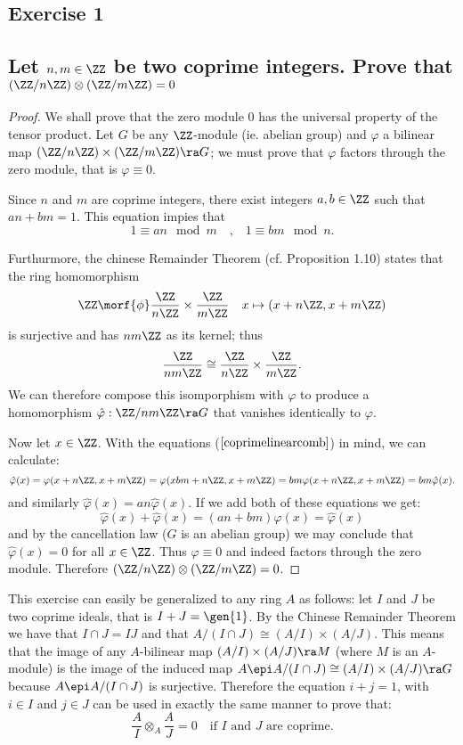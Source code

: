 \subsection*{Exercise 1}
\subsection*{%
Let $n,m\in\ZZ$ be two coprime integers. Prove that $(\ZZ/n\ZZ)\otimes(\ZZ/m\ZZ)=0$
} 

\begin{proof}%
We shall prove that the zero module $0$ has the universal property of the tensor product.
Let $G$ be any $\ZZ$-module (ie. abelian group) and $\varphi$ a bilinear map
$(\ZZ/n\ZZ)\times(\ZZ/m\ZZ)\ra G$; we must prove that $\varphi$ factors through the
zero module, that is $\varphi\equiv 0$.

Since $n$ and $m$ are coprime integers, there exist integers $a,b\in\ZZ$ such that $an+bm=1$.
This equation impies that
\begin{equation}\label{coprimelinearcomb}
	1\equiv an \mod m \quad\text{,}\quad 1\equiv  bm \mod n.
\end{equation}

Furthurmore, the chinese Remainder Theorem (cf. Proposition 1.10) states that the
ring homomorphism
\[
	\ZZ \morf{\phi} \frac{\ZZ}{n\ZZ}\times\frac{\ZZ}{m\ZZ} \quad x\mapsto (x+n\ZZ,x+m\ZZ)
\]
is surjective and has $nm\ZZ$ as its kernel; thus
\[
	\frac{\ZZ}{nm\ZZ}\cong\frac{\ZZ}{n\ZZ}\times\frac{\ZZ}{m\ZZ}.
\]
We can therefore compose this isomporphism with $\varphi$ to produce a homomorphism
$\hat{\varphi}:\ZZ/nm\ZZ\ra G$ that vanishes identically to $\varphi$.

Now let $x\in\ZZ$. With the equations ($\ref{coprimelinearcomb}$) in mind, we can
calculate:
\[
	\hat{\varphi}(x)=\varphi(x+n\ZZ,x+m\ZZ)=\varphi(xbm+n\ZZ,x+m\ZZ)=bm\varphi(x+n\ZZ,x+m\ZZ)%
			=bm\hat{\varphi}(x).
\]
and similarly $\hat{\varphi}(x)=an\hat{\varphi}(x)$. If we add both of these equations we get:
\[
	\hat{\varphi}(x)+\hat{\varphi}(x)=(an+bm)\hat{\varphi}(x)=\hat{\varphi}(x)
\]
and by the cancellation law ($G$ is an abelian group) we may conclude that $\hat{\varphi}(x)=0$
for all $x\in\ZZ$. Thus $\varphi\equiv 0$ and indeed factors through the zero module. Therefore
$(\ZZ/n\ZZ)\otimes(\ZZ/m\ZZ)=0$.
%
\end{proof}%

\begin{remark*}
	This exercise can easily be generalized to any ring $A$ as follows: let $I$ and $J$ be
	two coprime ideals, that is $I+J=\gen{1}$. By the Chinese Remainder Theorem we have that
	$I\cap J=IJ$ and that $A/(I\cap J)\cong(A/I)\times(A/J)$. This means that the image of
	any $A$-bilinear map $(A/I)\times(A/J)\ra M$ (where $M$ is an $A$-module) is the image
	of the induced map $A\epi A/(I\cap J)\cong(A/I)\times(A/J) \ra G$ because $A\epi A/(I\cap J)$
	is surjective. Therefore the equation $i+j=1$, with $i\in I$ and $j\in J$ can be used in
	exactly the same manner to prove that:
	\[
		\frac{A}{I}\otimes_A \frac{A}{J}=0 \quad\text{if $I$ and $J$ are coprime.}
	\]
\end{remark*}

